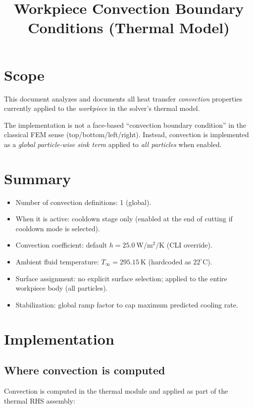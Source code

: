 \documentclass[11pt]{article}
\title{Workpiece Convection Boundary Conditions (Thermal Model)}
\author{}
\date{}
\begin{document}
\maketitle
\tableofcontents

\section{Scope}

This document analyzes and documents all heat transfer \emph{convection} properties currently applied to the \emph{workpiece} in the solver's thermal model.

The implementation is not a face-based ``convection boundary condition'' in the classical FEM sense (top/bottom/left/right). Instead, convection is implemented as a \emph{global particle-wise sink term} applied to \emph{all particles} when enabled.

\section{Summary}

\begin{itemize}
  \item Number of convection definitions: 1 (global).
  \item When it is active: cooldown stage only (enabled at the end of cutting if cooldown mode is selected).
  \item Convection coefficient: default $h = 25.0\ \mathrm{W/m^2/K}$ (CLI override).
  \item Ambient fluid temperature: $T_\infty = 295.15\ \mathrm{K}$ (hardcoded as $22^\circ\mathrm{C}$).
  \item Surface assignment: no explicit surface selection; applied to the entire workpiece body (all particles).
  \item Stabilization: global ramp factor to cap maximum predicted cooling rate.
\end{itemize}

\section{Implementation}

\subsection{Where convection is computed}

Convection is computed in the thermal module and applied as part of the thermal RHS assembly:
\end{document}
